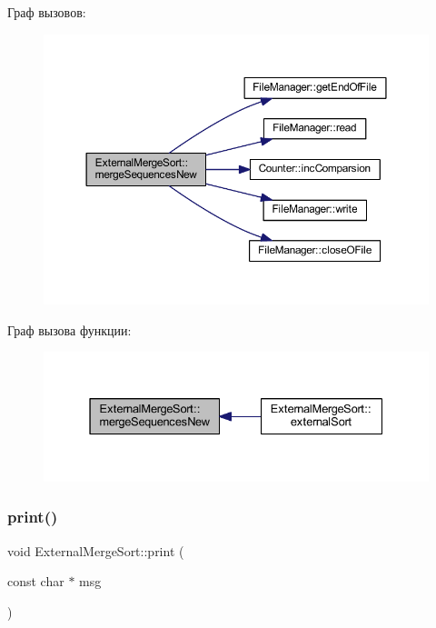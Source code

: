 Граф вызовов\+:\nopagebreak
\begin{figure}[H]
\begin{center}
\leavevmode
\includegraphics[width=350pt]{class_external_merge_sort_a8b4f951d9ee53818b8d3d4e84e2a1aa4_cgraph}
\end{center}
\end{figure}
Граф вызова функции\+:\nopagebreak
\begin{figure}[H]
\begin{center}
\leavevmode
\includegraphics[width=331pt]{class_external_merge_sort_a8b4f951d9ee53818b8d3d4e84e2a1aa4_icgraph}
\end{center}
\end{figure}
\hypertarget{class_external_merge_sort_a5e19d768fb9ef81e36e22e2eff498ca4}{}\label{class_external_merge_sort_a5e19d768fb9ef81e36e22e2eff498ca4} 
\subsubsection{\texorpdfstring{print()}{print()}}
{\footnotesize\ttfamily void External\+Merge\+Sort\+::print (\begin{DoxyParamCaption}\item[{const char $\ast$}]{msg }\end{DoxyParamCaption})\hspace{0.3cm}{\ttfamily [private]}}

